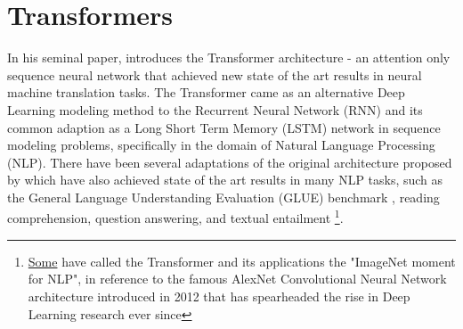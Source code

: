 \section{Transformers}
In his seminal paper, \citet{vaswani2017attention} introduces the Transformer architecture - an attention only sequence neural network that achieved new state of the art results in neural machine translation tasks. The Transformer came as an alternative Deep Learning modeling method to the Recurrent Neural Network (RNN) and its common adaption as a Long Short Term Memory (LSTM) network in sequence modeling problems, specifically in the domain of Natural Language Processing (NLP). There have been several adaptations of the original architecture proposed by \citet{vaswani2017attention} which have also achieved state of the art results in many NLP tasks, such as the General Language Understanding Evaluation (GLUE) benchmark \cite{devlin2018bert}\cite{wang2018glue}, reading comprehension, question answering, and textual entailment \cite{brown2020language} \footnote{\href{https://ruder.io/nlp-imagenet/}{Some} have called the Transformer and its applications the "ImageNet moment for NLP", in reference to the famous AlexNet Convolutional Neural Network architecture introduced in 2012 \cite{krizhevsky2017imagenet} that has spearheaded the rise in Deep Learning research ever since}. 

